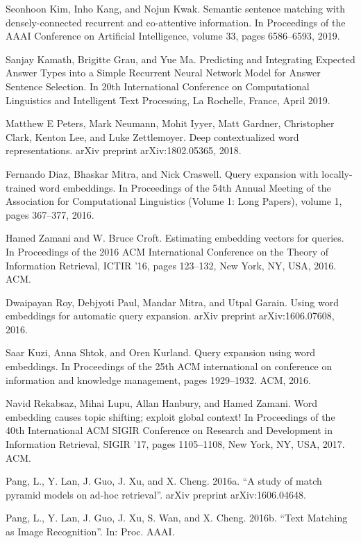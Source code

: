 \documentclass{llncs}
\begin{document}
\begin{thebibliography}{}
 Seonhoon Kim, Inho Kang, and Nojun Kwak. Semantic sentence matching with densely-connected recurrent and co-attentive information. In Proceedings of the AAAI Conference on Artificial Intelligence, volume 33, pages 6586–6593, 2019.

 Sanjay Kamath, Brigitte Grau, and Yue Ma. Predicting and Integrating Expected Answer Types into a Simple Recurrent Neural Network Model for Answer Sentence Selection. In 20th International Conference on Computational Linguistics and Intelligent Text Processing, La Rochelle, France, April 2019. 

  Matthew E Peters, Mark Neumann, Mohit Iyyer, Matt Gardner, Christopher Clark, Kenton Lee, and Luke Zettlemoyer. Deep contextualized word representations. arXiv preprint arXiv:1802.05365, 2018. 

 Fernando Diaz, Bhaskar Mitra, and Nick Craswell. Query expansion with locally-trained word embeddings. In Proceedings of the 54th Annual Meeting of the Association for Computational Linguistics (Volume 1: Long Papers), volume 1, pages 367–377, 2016.

 Hamed Zamani and W. Bruce Croft. Estimating embedding vectors for queries. In Proceedings of the 2016 ACM International Conference on the Theory of Information Retrieval, ICTIR ’16, pages 123–132, New York, NY, USA, 2016. ACM.

 Dwaipayan Roy, Debjyoti Paul, Mandar Mitra, and Utpal Garain. Using word embeddings for automatic query expansion. arXiv preprint arXiv:1606.07608, 2016.

 Saar Kuzi, Anna Shtok, and Oren Kurland. Query expansion using word embeddings. In Proceedings of the 25th ACM international on conference on information and knowledge management, pages 1929–1932. ACM, 2016.

 Navid Rekabsaz, Mihai Lupu, Allan Hanbury, and Hamed Zamani. Word embedding causes topic shifting; exploit global context! In Proceedings of the 40th International ACM SIGIR Conference on Research and Development in Information Retrieval, SIGIR ’17, pages 1105–1108, New York, NY, USA, 2017. ACM.

 Pang, L., Y. Lan, J. Guo, J. Xu, and X. Cheng. 2016a. “A study of match pyramid models on ad-hoc retrieval”. arXiv preprint arXiv:1606.04648.

 Pang, L., Y. Lan, J. Guo, J. Xu, S. Wan, and X. Cheng. 2016b. “Text Matching as Image Recognition”. In: Proc. AAAI.


\end{thebibliography}
\clearpage
\clearpage
%
\end{document}
